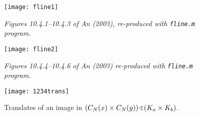 \begin{figure}[t]               
    \centering  
    \texttt{[image: fline1]}
  \caption{{\it Figures 10.4.1--10.4.3 of An (2003),
      re-produced with {\tt fline.m} program.}}  
  \label{fig:10.4.1}
\end{figure}

\begin{figure}[t]
    \centering  
    \texttt{[image: fline2]}
    \caption{{\it Figures 10.4.4--10.4.6 of An (2003)
        re-produced with {\tt fline.m} program.}}  
  \label{fig:10.4.4}
\end{figure}

\begin{figure}
    \centering  
    \texttt{[image: 1234trans]}
  \caption{Translates of an image in 
  $(C_N(x)\times C_N(y)) \sdp (K_a \times K_b)$.} 
  \label{fig:1234trans}
\end{figure}








%
%
%
%
%


%


